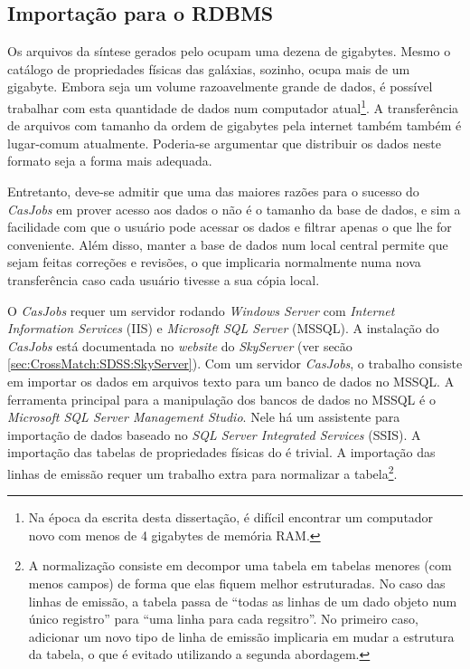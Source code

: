 \subsection{Importação para o RDBMS}

Os arquivos da síntese gerados pelo \starlight ocupam uma dezena de gigabytes.
Mesmo o catálogo de propriedades físicas das galáxias, sozinho, ocupa mais de um
gigabyte. Embora seja um volume razoavelmente grande de dados, é possível
trabalhar com esta quantidade de dados num computador atual\footnote{Na época da
escrita desta dissertação, é difícil encontrar um computador novo com menos de 4
gigabytes de memória RAM.}. A transferência de arquivos com tamanho da ordem de
gigabytes pela internet também também é lugar-comum atualmente. Poderia-se
argumentar que distribuir os dados neste formato seja a forma mais adequada.

Entretanto, deve-se admitir que uma das maiores razões para o sucesso do {\em
CasJobs} em prover acesso aos dados o \SDSS não é o tamanho da base de dados, e
sim a facilidade com que o usuário pode acessar os dados e filtrar apenas o que
lhe for conveniente. Além disso, manter a base de dados num local central
permite que sejam feitas correções e revisões, o que implicaria normalmente numa
nova transferência caso cada usuário tivesse a sua cópia local.

O {\em CasJobs} requer um servidor rodando {\em Windows Server} com {\em
Internet Information Services} (IIS) e {\em Microsoft SQL Server} (MSSQL). A
instalação do {\em CasJobs} está documentada no {\em website} do {\em SkyServer}
(ver secão \ref{sec:CrossMatch:SDSS:SkyServer}). Com um servidor {\em CasJobs},
o trabalho consiste em importar os dados em arquivos texto para um banco de
dados no MSSQL. A ferramenta principal para a manipulação dos bancos de dados no
MSSQL é o {\em Microsoft SQL Server Management Studio}. Nele há um assistente
para importação de dados baseado no {\em SQL Server Integrated Services} (SSIS).
A importação das tabelas de propriedades físicas do \starlight é trivial. A
importação das linhas de emissão requer um trabalho extra para normalizar a
tabela\footnote{A normalização consiste em decompor uma tabela em tabelas
menores (com menos campos) de forma que elas fiquem melhor estruturadas. No caso
das linhas de emissão, a tabela passa de ``todas as linhas de um dado objeto num
único registro'' para ``uma linha para cada regsitro''. No primeiro caso,
adicionar um novo tipo de linha de emissão implicaria em mudar a estrutura da
tabela, o que é evitado utilizando a segunda abordagem.}.

